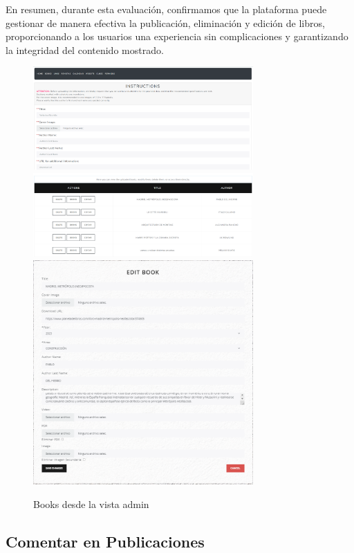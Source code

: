 \documentclass[a4paper, 12pt]{book}
\begin{document}
En resumen, durante esta evaluación, confirmamos que la plataforma puede gestionar de manera efectiva la publicación, eliminación y edición de libros, 
proporcionando a los usuarios una experiencia sin complicaciones y garantizando la integridad del contenido mostrado.
\begin{figure}
  \centering
  \includegraphics[width=0.75\textwidth]{img/booksadmin.png}
  \includegraphics[width=0.75\textwidth]{img/booksadmin2.png}
  \includegraphics[width=0.75\textwidth]{img/booksadmin3.png}
  \caption{Books desde la vista admin}
  \label{fig:librosadminedit}
\end{figure}

\subsection{Comentar en Publicaciones}
\label{sec:comment-on-posts}
\end{document}
